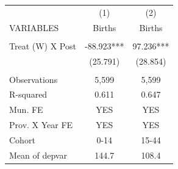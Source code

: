 \begin{tabular}{lcc} \hline
 & (1) & (2) \\
VARIABLES & Births & Births \\ \hline
 &  &  \\
Treat (W) X Post & -88.923*** & 97.236*** \\
 & (25.791) & (28.854) \\
 &  &  \\
Observations & 5,599 & 5,599 \\
R-squared & 0.611 & 0.647 \\
Mun. FE & YES & YES \\
Prov. X Year FE & YES & YES \\
Cohort & 0-14 & 15-44 \\
 Mean of depvar & 144.7 & 108.4 \\ \hline
\end{tabular}
